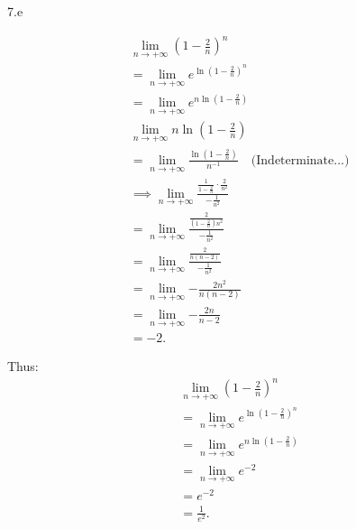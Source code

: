 \documentclass{report}
\begin{document}
    \bigbreak \noindent 
    7.e
    \bigbreak \noindent 
    \begin{minipage}[t]{0.47\textwidth}
        \begin{align*}
            &\lim\limits_{n \to +\infty}{\left(1-\frac{2}{n}\right)^{n}} \\
            &=\lim\limits_{n \to +\infty}{e^{\ln{\left(1-\frac{2}{n}\right)^{n}}}} \\
            &=\lim\limits_{n \to +\infty}{e^{n\ln{\left(1-\frac{2}{n}\right)}}} \\
            &\lim\limits_{n \to +\infty}{n\ln{\left(1-\frac{2}{n}\right)}} \\
            &=\lim\limits_{n \to +\infty}{\frac{\ln{\left(1-\frac{2}{n}\right)}}{n^{-1}}} \quad \text{(Indeterminate...)}\\
            &\implies\lim\limits_{n \to +\infty}{\frac{\frac{1}{1-\frac{2}{n}}\cdot \frac{2}{n^{2}}}{-\frac{1}{n^{2}}}} \\
            &=\lim\limits_{n \to +\infty}{\frac{\frac{2}{\left(1-\frac{2}{n}\right)n^{2}}}{-\frac{1}{n^{2}}}} \\
            &=\lim\limits_{n \to +\infty}{\frac{\frac{2}{n(n-2)}}{-\frac{1}{n^{2}}}} \\
            &=\lim\limits_{n \to +\infty}{-\frac{2n^{2}}{n(n-2)}} \\
            &=\lim\limits_{n \to +\infty}{-\frac{2n}{n-2}} \\
            &=-2
        .\end{align*}
    \end{minipage}
    \begin{minipage}[t]{0.47\textwidth}
        Thus: 
        \begin{align*}
            &\lim\limits_{n \to +\infty}{\left(1-\frac{2}{n}\right)^{n}} \\
            &=\lim\limits_{n \to +\infty}{e^{\ln{\left(1-\frac{2}{n}\right)^n}}} \\
            &=\lim\limits_{n \to +\infty}{e^{n\ln{\left(1-\frac{2}{n}\right)}}} \\
            &=\lim\limits_{n \to +\infty}{e^{-2}} \\
            &=e^{-2} \\
            &=\frac{1}{e^{2}}
        .\end{align*}
    \end{minipage}
\end{document}
